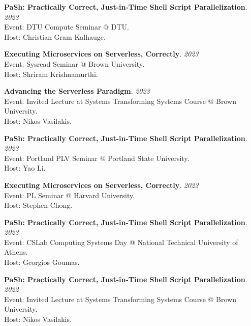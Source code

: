 \begin{minipage}{\textwidth}
\textbf{PaSh: Practically Correct, Just-in-Time Shell Script Parallelization}. \hfill {\em 2023}\\
Event: DTU Compute Seminar @ DTU.\\
 Host: Christian Gram Kalhauge.
\end{minipage}

\begin{minipage}{\textwidth}
\textbf{Executing Microservices on Serverless, Correctly}. \hfill {\em 2023}\\
Event: Sysread Seminar @ Brown University.\\
 Host: Shriram Krishnamurthi.
\end{minipage}

\begin{minipage}{\textwidth}
\textbf{Advancing the Serverless Paradigm}. \hfill {\em 2023}\\
Event: Invited Lecture at Systems Transforming Systems Course @ Brown University.\\
 Host: Nikos Vasilakis.
\end{minipage}

\begin{minipage}{\textwidth}
\textbf{PaSh: Practically Correct, Just-in-Time Shell Script Parallelization}. \hfill {\em 2023}\\
Event: Portland PLV Seminar @ Portland State University.\\
 Host: Yao Li.
\end{minipage}

\begin{minipage}{\textwidth}
\textbf{Executing Microservices on Serverless, Correctly}. \hfill {\em 2023}\\
Event: PL Seminar @ Harvard University.\\
 Host: Stephen Chong.
\end{minipage}

\begin{minipage}{\textwidth}
\textbf{PaSh: Practically Correct, Just-in-Time Shell Script Parallelization}. \hfill {\em 2023}\\
Event: CSLab Computing Systems Day @ National Technical University of Athens.\\
 Host: Georgios Goumas.
\end{minipage}

\begin{minipage}{\textwidth}
\textbf{PaSh: Practically Correct, Just-in-Time Shell Script Parallelization}. \hfill {\em 2022}\\
Event: Invited Lecture at Systems Transforming Systems Course @ Brown University.\\
 Host: Nikos Vasilakis.
\end{minipage}

